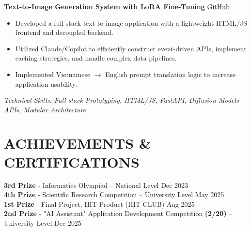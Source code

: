 \documentclass[10pt, a4paper]{article}
\begin{document}
\vspace{0.5em}

\noindent\textbf{Text-to-Image Generation System with LoRA Fine-Tuning} \hfill \href{https://github.com/AE-AI-HIT15/HIT_LungTung}{GitHub}
\begin{itemize}[leftmargin=1.5em, itemsep=0pt]
    \item Developed a full-stack text-to-image application with a lightweight HTML/JS frontend and decoupled backend.
    \item Utilized Claude/Copilot to efficiently construct event-driven APIs, implement caching strategies, and handle complex data pipelines.
    \item Implemented Vietnamese $\to$ English prompt translation logic to increase application usability.
\end{itemize}
\emph{Technical Skills: Full-stack Prototyping, HTML/JS, FastAPI, Diffusion Models APIs, Modular Architecture}

\section*{ACHIEVEMENTS \& CERTIFICATIONS}
\noindent\textbf{3rd Prize} - Informatics Olympiad -- National Level \hfill Dec 2023 \\
\noindent\textbf{4th Prize} - Scientific Research Competition -- University Level \hfill May 2025 \\
\noindent\textbf{1st Prize} - Final Project, HIT Product (HIT CLUB) \hfill Aug 2025 \\
\noindent\textbf{2nd Prize} - "AI Assistant" Application Development Competition \textbf{(2/20)} -- University Level \hfill Dec 2025
\end{document}
